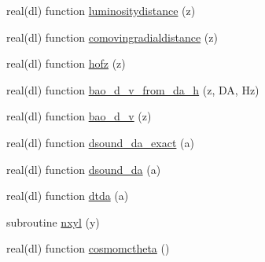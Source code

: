 \begin{DoxyCompactItemize}
real(dl) function \mbox{\hyperlink{namespacemodelparams_a40c5d69daf3f5689ecf0c29c19257028}{luminositydistance}} (z)
\item 
real(dl) function \mbox{\hyperlink{namespacemodelparams_ad0393036efc0bf4d20eba5112748a1a2}{comovingradialdistance}} (z)
\item 
real(dl) function \mbox{\hyperlink{namespacemodelparams_a0180f3c86db3b86362776831ebdb2ff2}{hofz}} (z)
\item 
real(dl) function \mbox{\hyperlink{namespacemodelparams_a3a1026b2054f510f0c0dd9ee5c95e1b9}{bao\+\_\+d\+\_\+v\+\_\+from\+\_\+da\+\_\+h}} (z, DA, Hz)
\item 
real(dl) function \mbox{\hyperlink{namespacemodelparams_a39160c5bd9a51624f48cbef4197bb22f}{bao\+\_\+d\+\_\+v}} (z)
\item 
real(dl) function \mbox{\hyperlink{namespacemodelparams_a57d61799939e1d3d5984dba316f8cc6a}{dsound\+\_\+da\+\_\+exact}} (a)
\item 
real(dl) function \mbox{\hyperlink{namespacemodelparams_a60c72460cbce332f5142d619a906fa16}{dsound\+\_\+da}} (a)
\item 
real(dl) function \mbox{\hyperlink{namespacemodelparams_a0ab3d80c1ede505b3412f5b33bd3a202}{dtda}} (a)
\item 
subroutine \mbox{\hyperlink{namespacemodelparams_af7cba6b22f91f9428ebecb63823d451a}{nxyl}} (y)
\item 
real(dl) function \mbox{\hyperlink{namespacemodelparams_ab4a4cc860939dbbdc0236048b5f9457e}{cosmomctheta}} ()
\end{DoxyCompactItemize}
